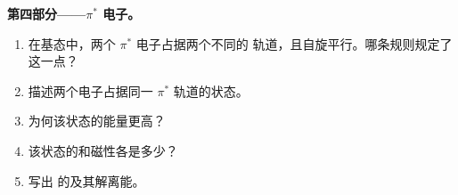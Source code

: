 \begin{problem}
\medskip
\noindent\textbf{第四部分——$\pi^*$ 电子。}
\begin{enumerate}[resume]
  \item 在基态中，两个 $\pi^*$ 电子占据两个不同的
        轨道，且自旋平行。哪条规则规定了这一点？
  \item 描述两个电子占据同一 $\pi^*$ 轨道的状态。
  \item 为何该状态的能量更高？
  \item 该状态的和磁性各是多少？
  \item 写出  的及其解离能。
\end{enumerate}
\end{problem}
